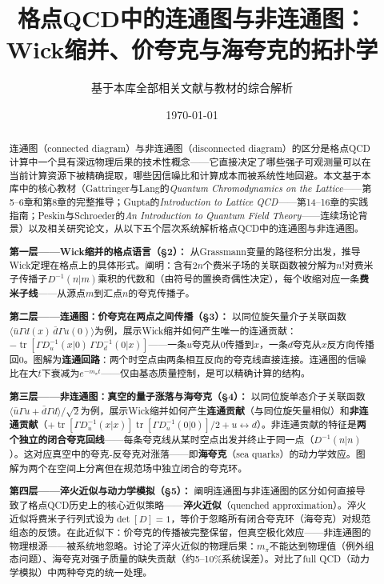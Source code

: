 \documentclass[12pt,a4paper]{ctexart}
\title{\heiti 格点QCD中的连通图与非连通图：\\
Wick缩并、价夸克与海夸克的拓扑学}
\author{基于本库全部相关文献与教材的综合解析}
\date{\today}
\theoremstyle{definition}
\begin{document}
\maketitle

\begin{abstract}
\noindent
连通图（connected diagram）与非连通图（disconnected diagram）的区分是格点QCD计算中一个具有深远物理后果的技术性概念——它直接决定了哪些强子可观测量可以在当前计算资源下被精确提取，哪些因信噪比和计算成本而被系统性地回避。本文基于本库中的核心教材（Gattringer与Lang的\textit{Quantum Chromodynamics on the Lattice}——第5--6章和第8章的完整推导；Gupta的\textit{Introduction to Lattice QCD}——第14--16章的实践指南；Peskin与Schroeder的\textit{An Introduction to Quantum Field Theory}——连续场论背景）以及相关研究论文，从以下五个层次系统解析格点QCD中的连通图与非连通图。

\textbf{第一层——Wick缩并的格点语言（§2）：}
从Grassmann变量的路径积分出发，推导Wick定理在格点上的具体形式。阐明：含有$2n$个费米子场的关联函数被分解为$n!$对费米子传播子$D^{-1}(n|m)$乘积的代数和（由符号的置换奇偶性决定），每个收缩对应一条\textbf{费米子线}——从源点$m$到汇点$n$的夸克传播子。

\textbf{第二层——连通图：价夸克在两点之间传播（§3）：}
以同位旋矢量介子关联函数$\langle \bar u\Gamma d(x)\,\bar d\Gamma u(0)\rangle$为例，展示Wick缩并如何产生唯一的连通贡献：$-\operatorname{tr}[\Gamma D_u^{-1}(x|0)\,\Gamma D_d^{-1}(0|x)]$——一条$u$夸克从$0$传播到$x$，一条$d$夸克从$x$反方向传播回$0$。图解为\textbf{连通回路}：两个时空点由两条相互反向的夸克线直接连接。连通图的信噪比在大$t$下衰减为$e^{-m_\pi t}$——仅由基态质量控制，是可以精确计算的结构。

\textbf{第三层——非连通图：真空的量子涨落与海夸克（§4）：}
以同位旋单态介子关联函数$\langle \bar u\Gamma u + \bar d\Gamma d\rangle/\sqrt{2}$为例，展示Wick缩并如何产生\textbf{连通贡献}（与同位旋矢量相似）和\textbf{非连通贡献}（$+\operatorname{tr}[\Gamma D_u^{-1}(x|x)]\operatorname{tr}[\Gamma D_u^{-1}(0|0)]/2 + u\leftrightarrow d$）。非连通贡献的特征是\textbf{两个独立的闭合夸克回线}——每条夸克线从某时空点出发并终止于同一点（$D^{-1}(n|n)$）。这对应真空中的夸克-反夸克对涨落——即\textbf{海夸克}（sea quarks）的动力学效应。图解为两个在空间上分离但在规范场中独立闭合的夸克环。

\textbf{第四层——淬火近似与动力学模拟（§5）：}
阐明连通图与非连通图的区分如何直接导致了格点QCD历史上的核心近似策略——\textbf{淬火近似}（quenched approximation）。淬火近似将费米子行列式设为$\det[D] = 1$，等价于忽略所有闭合夸克环（海夸克）对规范组态的反馈。在此近似下：价夸克的传播被完整保留，但真空极化效应——非连通图的物理根源——被系统地忽略。讨论了淬火近似的物理后果：$m_\pi$不能达到物理值（例外组态问题）、海夸克对强子质量的缺失贡献（约5--10\%系统误差）。对比了full QCD（动力学模拟）中两种夸克的统一处理。


\end{abstract}
\end{document}
